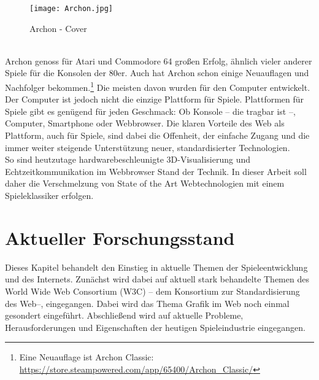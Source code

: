 \begin{figure}[htp]
\centering
\captionsetup{justification=centering}
\texttt{[image: Archon.jpg]}
\caption[Archon - Cover]{Archon - Cover\footnotemark}
\label{fig:Archon_Cover}
\end{figure}
\\
Archon genoss für Atari und Commodore 64 großen Erfolg, ähnlich vieler anderer Spiele für die Konsolen der 80er. Auch hat Archon schon einige Neuauflagen und Nachfolger bekommen.\footnote{Eine Neuauflage ist Archon Classic: \url{https://store.steampowered.com/app/65400/Archon_Classic/}}
Die meisten davon wurden für den Computer entwickelt. Der Computer ist jedoch nicht die einzige Plattform für Spiele.
Plattformen für Spiele gibt es genügend für jeden Geschmack: Ob Konsole -- die \ggf tragbar ist --, Computer, Smartphone oder Webbrowser.
Die klaren Vorteile des Web als Plattform, auch für Spiele, sind dabei die Offenheit, der einfache Zugang und die immer weiter steigende Unterstützung neuer, standardisierter Technologien.\\
So sind heutzutage hardwarebeschleunigte\footnotemark{} 3D-Visualisierung und Echtzeitkommunikation im Webbrowser Stand der Technik.
In dieser Arbeit soll daher die Verschmelzung von State of the Art Webtechnologien mit einem Spieleklassiker erfolgen.\\

\section{Aktueller Forschungsstand}
\label{sec:aktueller_forschungsstand}
\noindent Dieses Kapitel behandelt den Einstieg in aktuelle Themen der Spieleentwicklung und des Internets. Zunächst wird dabei auf aktuell stark behandelte Themen des World Wide Web Consortium (W3C) -- dem Konsortium zur Standardisierung des Web--, eingegangen. Dabei wird das Thema Grafik im Web noch einmal gesondert eingeführt. Abschließend wird auf aktuelle Probleme, Herausforderungen und Eigenschaften der heutigen Spieleindustrie eingegangen.

